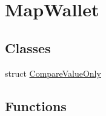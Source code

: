 \hypertarget{group__map_wallet}{}\section{Map\+Wallet}
\label{group__map_wallet}
\subsection*{Classes}
\begin{DoxyCompactItemize}
\item 
struct \mbox{\hyperlink{struct_compare_value_only}{Compare\+Value\+Only}}
\end{DoxyCompactItemize}
\subsection*{Functions}
